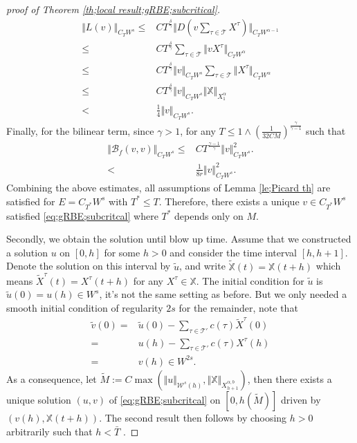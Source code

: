 \documentclass{article}
\numberwithin{equation}{section}
\newcommand{\m}{\mathbb}
\newcommand{\ml}{\mathcal}
\begin{document}
\begin{proof}[proof of Theorem \ref{th;local result;gRBE;subcritical}]
\begin{align*}
     	\Vert L(v)\Vert_{C_{T}W^{s}}\leq& CT^{\frac{\delta}{\gamma}}\Vert D(v\sum_{\tau\in \ml T}X^{\tau})\Vert_{C_{T}W^{\alpha-1}}\\
     	\leq& CT^{\frac{\delta}{\gamma}}\sum_{\tau\in \ml T}\Vert vX^{\tau}\Vert_{C_{T}W^{\alpha}}\\
     	\leq &CT^{\frac{\delta}{\gamma}}\Vert v\Vert_{C_{T}W^{s}}\sum_{\tau\in \ml T}\Vert X^{\tau}\Vert_{C_{T}W^{\alpha}}\\
     	\leq &CT^{\frac{\delta}{\gamma}}\Vert v\Vert_{C_{T}W^{s}}\Vert \m X\Vert_{X^{\alpha}_{1}}\\
     	<&\frac{1}{4}\Vert v\Vert_{C_{T}W^{s}}.
     \end{align*}  
    Finally, for the bilinear term, since $\gamma>1$, for any $T\leq 1\wedge(\frac{1}{32CM})^{\frac{\gamma}{\gamma-1}}$ such that
     \begin{align*}
     	\Vert \ml B_f(v,v)\Vert_{C_{T}W^{s}}\leq& CT^{\frac{\gamma-1}{\gamma}}	\Vert v\Vert_{C_{T}W^{s}}^2.\\
     	<&\frac{1}{8r}\Vert v\Vert_{C_{T}W^{s}}^2.
     \end{align*}
    Combining the above estimates, all assumptions of Lemma  \ref{le;Picard th} are satisfied for $E=C_{T^*}W^s$ with $T^*\leq T$. Therefore, there exists a unique $v\in C_{T^*}W^s$ satisfied \eqref{eq;gRBE;subcritcal} where $T^*$ depends only on $M$. 
    \par Secondly, we obtain the solution until blow up time. Assume that we constructed a solution $u$ on $[0,h]$ for some $h>0$ and consider the time interval $[h,h+1]$. Denote the solution on this interval by $\tilde u$, and write $\tilde{\m X}(t)=\m X(t+h)$ which means $\tilde X^{\tau}(t)=X^{\tau}(t+h)$ for any $X^{\tau}\in \m X$. The initial condition for $\tilde u$ is $\tilde u(0)=u(h)\in W^s$, it's not the same setting as before. But we only needed a smooth initial condition of regularity $2s$ for the remainder, note that 
    \begin{align*}
    	\tilde v(0)=&\tilde u(0)-\sum_{\tau\in\ml T'}c(\tau) \tilde X^{\tau}(0)\\
    	=&u(h)-\sum_{\tau\in\ml T'}c(\tau) X^{\tau}(h)\\
    	=&v(h)\in W^{2s}.
    \end{align*}
    As a consequence, let $\tilde{M}:=C\max(\Vert u\Vert_{\ml W^s(h)}, \Vert \m X\Vert_{X_{h+1}^{\alpha,b}})$, then there exists a unique solution $(u,v)$ of \eqref{eq;gRBE;subcritcal} on $[0,h(\tilde M)]$ driven by $(v(h),\m X(t+h))$. The second result then follows by choosing $h>0$ arbitrarily such that  $h<\bar T$ .

\end{proof}
\end{document}
